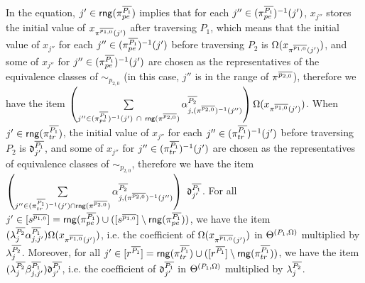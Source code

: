 In the equation, $j' \in  \mathsf{rng}(\pi^{\overline{P_1}}_{pe})$ implies that for each $j'' \in  (\pi^{\overline{P_1}}_{pe})^{-1}(j')$,  $x_{j''}$ stores the initial value of $x_{\pi^{\overline{p_{1,0}}}(j')}$ after traversing $P_1$, which means that the initial value of $x_{j''}$ for each $j'' \in  (\pi^{\overline{P_1}}_{pe})^{-1}(j')$ before traversing $P_2$ is $\Omega(x_{\pi^{\overline{p_{1,0}}}(j')})$, and some of $x_{j''}$ for $j'' \in  (\pi^{\overline{P_1}}_{pe})^{-1}(j')$ are chosen as the representatives of the equivalence classes of $\sim_{p_{2,0}}$ (in this case, $j''$ is in the range of $\pi^{\overline{p_{2,0}}}$), therefore we have the item $\left( \sum \limits_{j'' \in (\pi^{\circled{P_1}}_{pe})^{-1}(j')\ \cap\ \rng(\pi^{\circled{p_{2,0}}})}  \csta^{\circled{P_2}}_{j,(\pi^{\circled{p_{2,0}}})^{-1}(j'')} \right) \initval(x_{\pi^{\circled{p_{1,0}}}(j')})$. When $j' \in \mathsf{rng}(\pi^{\overline{P_1}}_{tr})$, the initial value of $x_{j''}$ for each $j'' \in (\pi^{\overline{P_1}}_{tr})^{-1}(j')$ before traversing $P_2$ is $\mathfrak{d}^{\overline{P_1}}_{j'}$, and some of $x_{j''}$ for $j'' \in (\pi^{\overline{P_1}}_{tr})^{-1}(j')$ are chosen as the representatives of equivalence classes of $\sim_{p_{2,0}}$, therefore we have the item $\left(\sum \limits_{j'' \in (\pi^{\circled{P_1}}_{tr})^{-1}(j') \cap \rng(\pi^{\circled{p_{2,0}}})} \csta^{\circled{P_2}}_{j, (\pi^{\circled{p_{2,0}}})^{-1}(j'')} \right)\ \vard^{\circled{P_1}}_{j'}$.
For all $j'\in [s^{\overline{p_{1,0}}}] =\mathsf{rng}(\pi^{\overline{P_1}}_{pe}) \cup ([s^{\overline{p_{1,0}}}] \setminus \mathsf{rng}(\pi^{\overline{P_1}}_{pe}))$, we have the item $(\lambda^{\overline{P_2}}_{j} \alpha^{\overline{P_1}}_{j,j'}) \Omega(x_{\pi^{\overline{p_{1,0}}}(j')})$, i.e. the coefficient of $\Omega(x_{\pi^{\overline{p_{1,0}}}(j')})$ in $\Theta^{(P_1, \Omega)}$ multiplied by $\lambda^{\overline{P_2}}_{j}$. Moreover, for all $j'\in [r^{\overline{P_1}}] = \mathsf{rng}(\pi^{\overline{P_1}}_{tr}) \cup ([r^{\overline{P_1}}] \setminus \mathsf{rng}(\pi^{\overline{P_1}}_{tr}))$, we have 
the item $( \lambda^{\overline{P_2}}_{j} \beta^{\overline{P_1}}_{j,j'}) \mathfrak{d}^{\overline{P_1}}_{j'}$, i.e. the coefficient of $\mathfrak{d}^{\overline{P_1}}_{j'}$ in $\Theta^{(P_1, \Omega)}$ multiplied by $\lambda^{\overline{P_2}}_{j}$.

